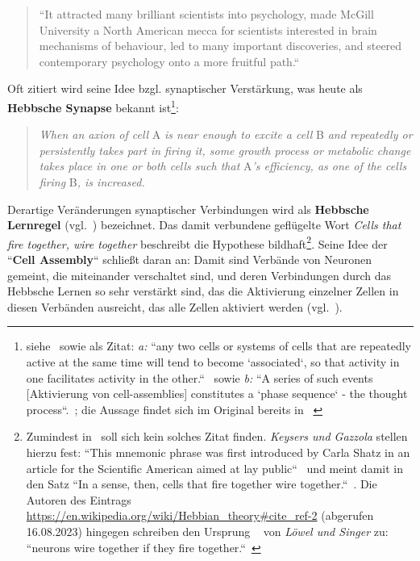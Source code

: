 \blockquote[{\cite[1]{Kle99}}]{
    ``It attracted many
    brilliant scientists into psychology, made McGill University a North American mecca for scientists interested in brain mechanisms of behaviour, led to many important discoveries, and steered contemporary psychology onto a more fruitful path.``
}

Oft zitiert wird seine Idee bzgl. synaptischer Verstärkung, was heute als \textbf{Hebbsche Synapse} bekannt ist\footnote{
    siehe~\cite[43]{AR88} sowie als Zitat: \textit{a:} ``any two cells or systems of cells that are repeatedly active at the same time will tend to become `associated`, so that activity in one facilitates activity in the other.``~\cite[52]{Heb88} sowie \textit{b:} ``A series of such events [Aktivierung von cell-assemblies] constitutes a `phase sequence` - the thought process``.~\cite[48]{Heb88}; die Aussage findet sich im Original bereits in ~\cite[xi-xix, ``Introduction``]{Heb49}
}:

\blockquote[{\cite[50; Hervorhebung i.O.]{Heb88}}]{
    \textit{When an axion of cell} A \textit{is near enough to excite a cell} B \textit{and repeatedly or persistently takes part in firing it, some growth process or metabolic change takes place in one or both cells such that} A\textit{'s efficiency, as one of the cells firing} B\textit{, is increased.}
}


Derartige Veränderungen synaptischer Verbindungen wird als \textbf{Hebbsche Lernregel} (vgl.~\cite[985]{BCP18}) bezeichnet.
Das damit verbundene geflügelte Wort \textit{Cells that fire together, wire together} beschreibt die Hypothese bildhaft\footnote{
    Zumindest in~\cite{Heb49} soll sich kein solches Zitat finden. \textit{Keysers und Gazzola} stellen hierzu fest: ``This mnemonic phrase was first introduced by Carla Shatz in an article for the Scientific American aimed at lay public``~\cite[2, Fussnotenmarker entfernt]{KG14} und meint damit in~\cite{Sha92} den Satz ``In a sense, then, cells that fire together wire together.``~\cite[64]{Sha92}. Die Autoren des Eintrags \url{https://en.wikipedia.org/wiki/Hebbian\_theory\#cite\_ref-2} (abgerufen 16.08.2023) hingegen schreiben den Ursprung ~\cite{LS92} von \textit{Löwel und Singer} zu: ``neurons wire together if they fire together.``~\cite[211]{LS92}
}.
Seine Idee der ``\textbf{Cell Assembly}`` schließt daran an: Damit sind Verbände von Neuronen gemeint, die miteinander verschaltet sind, und deren Verbindungen durch das Hebbsche Lernen so sehr verstärkt sind, das die Aktivierung einzelner Zellen in diesen Verbänden ausreicht, das alle Zellen aktiviert werden (vgl.~\cite[907 f.]{BCP18}).

